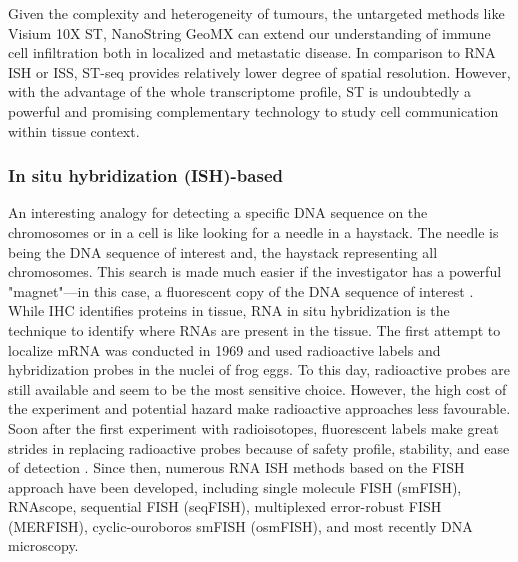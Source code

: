 Given the complexity and heterogeneity of tumours, the untargeted methods like Visium 10X  ST, NanoString GeoMX can extend our understanding of immune cell infiltration both in localized and metastatic disease. In comparison to RNA ISH or ISS, ST-seq provides relatively lower degree of spatial resolution. However, with the advantage of the whole transcriptome profile, ST is undoubtedly a powerful and promising complementary technology to study cell communication within tissue context.  

\subsubsection{In situ hybridization (ISH)-based}
An interesting analogy for detecting a specific DNA sequence on the chromosomes or in a cell is like looking for a needle in a haystack. The needle is being the DNA sequence of interest and, the haystack representing all chromosomes. This search is made much easier if the investigator has a powerful "magnet"—in this case, a fluorescent copy of the DNA sequence of interest \cite{Connor2008natureEdu}. While IHC identifies proteins in tissue, RNA in situ hybridization is the technique to identify where RNAs are present in the tissue. The first attempt to localize mRNA was conducted in 1969 and used radioactive labels and hybridization probes in the nuclei of frog eggs. To this day, radioactive probes are still available and seem to be the most sensitive choice. However, the high cost of the experiment and potential hazard make radioactive approaches less favourable. Soon after the first experiment with radioisotopes, fluorescent labels make great strides in replacing radioactive probes because of safety profile, stability, and ease of detection \cite{rudkin1977high, Connor2008natureEdu}. Since then, numerous RNA ISH methods based on the FISH approach have been developed, including single molecule FISH (smFISH), RNAscope, sequential FISH (seqFISH), multiplexed error-robust FISH (MERFISH), cyclic-ouroboros smFISH (osmFISH), and most recently DNA microscopy. 

